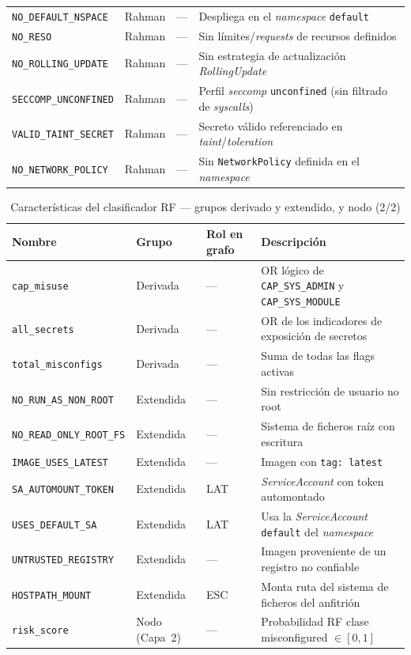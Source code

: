 \begin{table}[htbp]
\begin{tabular}{@{}p{4.2cm}llp{4.5cm}@{}}
\texttt{NO\_DEFAULT\_NSPACE} & Rahman & — & Despliega en el \textit{namespace} \texttt{default} \\
\texttt{NO\_RESO} & Rahman & — & Sin límites/\textit{requests} de recursos definidos \\
\texttt{NO\_ROLLING\_UPDATE} & Rahman & — & Sin estrategia de actualización \textit{RollingUpdate} \\
\texttt{SECCOMP\_UNCONFINED} & Rahman & — & Perfil \textit{seccomp} \texttt{unconfined} (sin filtrado de \textit{syscalls}) \\
\texttt{VALID\_TAINT\_SECRET} & Rahman & — & Secreto válido referenciado en \textit{taint}/\textit{toleration} \\
\texttt{NO\_NETWORK\_POLICY} & Rahman & — & Sin \texttt{NetworkPolicy} definida en el \textit{namespace} \\
\bottomrule
\end{tabular}
\fuentepropia
\end{table}

\begin{table}[htbp]
\centering\small
\caption{Características del clasificador \ac{RF} — grupos derivado y extendido, y nodo (2/2)}
\label{tab:features_b}
\begin{tabular}{@{}p{4.2cm}llp{4.5cm}@{}}
\toprule
Nombre & Grupo & Rol en grafo & Descripción \\
\midrule
\texttt{cap\_misuse} & Derivada & — & OR lógico de \texttt{CAP\_SYS\_ADMIN} y \texttt{CAP\_SYS\_MODULE} \\
\texttt{all\_secrets} & Derivada & — & OR de los indicadores de exposición de secretos \\
\texttt{total\_misconfigs} & Derivada & — & Suma de todas las flags activas \\
\texttt{NO\_RUN\_AS\_NON\_ROOT} & Extendida & — & Sin restricción de usuario no root \\
\texttt{NO\_READ\_ONLY\_ROOT\_FS} & Extendida & — & Sistema de ficheros raíz con escritura \\
\texttt{IMAGE\_USES\_LATEST} & Extendida & — & Imagen con \texttt{tag: latest} \\
\texttt{SA\_AUTOMOUNT\_TOKEN} & Extendida & LAT & \textit{ServiceAccount} con token automontado \\
\texttt{USES\_DEFAULT\_SA} & Extendida & LAT & Usa la \textit{ServiceAccount} \texttt{default} del \textit{namespace} \\
\texttt{UNTRUSTED\_REGISTRY} & Extendida & — & Imagen proveniente de un registro no confiable \\
\texttt{HOSTPATH\_MOUNT} & Extendida & ESC & Monta ruta del sistema de ficheros del anfitrión \\
\texttt{risk\_score} & Nodo (Capa~2) & — & Probabilidad \ac{RF} clase misconfigured \(\in [0,1]\) \\
\bottomrule
\end{tabular}
\fuentepropia
\end{table}

